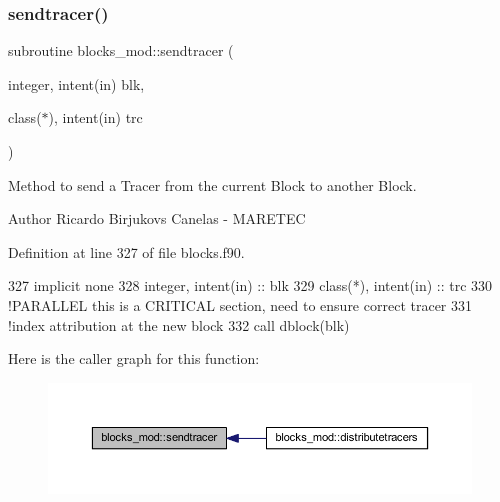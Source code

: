 \subsubsection{\texorpdfstring{sendtracer()}{sendtracer()}}
{\footnotesize\ttfamily subroutine blocks\+\_\+mod\+::sendtracer (\begin{DoxyParamCaption}\item[{integer, intent(in)}]{blk,  }\item[{class($\ast$), intent(in)}]{trc }\end{DoxyParamCaption})\hspace{0.3cm}{\ttfamily [private]}}



Method to send a Tracer from the current Block to another Block. 

\begin{DoxyAuthor}{Author}
Ricardo Birjukovs Canelas -\/ M\+A\+R\+E\+T\+EC 
\end{DoxyAuthor}


Definition at line 327 of file blocks.\+f90.


\begin{DoxyCode}
327     \textcolor{keywordtype}{implicit none}
328     \textcolor{keywordtype}{integer}, \textcolor{keywordtype}{intent(in)} :: blk
329     \textcolor{keywordtype}{class}(*), \textcolor{keywordtype}{intent(in)} :: trc
330     \textcolor{comment}{!PARALLEL this is a CRITICAL section, need to ensure correct tracer}
331     \textcolor{comment}{!index attribution at the new block}
332     \textcolor{keyword}{call }dblock(blk)%
\end{DoxyCode}
Here is the caller graph for this function\+:
\nopagebreak
\begin{figure}[H]
\begin{center}
\leavevmode
\includegraphics[width=350pt]{namespaceblocks__mod_a5a9992de40470e417ec8e40e688f6a0e_icgraph}
\end{center}
\end{figure}
\mbox{\label{namespaceblocks__mod_a8f5a5d9e6cfd16cfd1b179092a204696}} 
